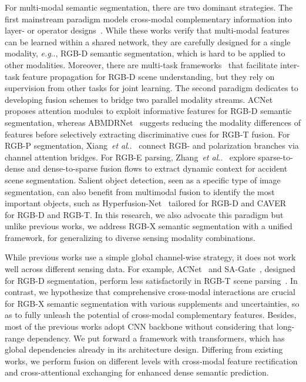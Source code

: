\documentclass[journal]{IEEEtran}
\makeatletter
\DeclareRobustCommand\onedot{\futurelet\@let@token\@onedot}
\def\@onedot{\ifx\@let@token.\else.\null\fi\xspace}
\def\eg{\emph{e.g}\onedot} \def\Eg{\emph{E.g}\onedot}
\def\etal{\emph{et al}\onedot}
\makeatother
\begin{document}
For multi-modal semantic segmentation, there are two dominant strategies. The first mainstream paradigm models cross-modal complementary information into layer- or operator designs~\cite{cao2021shapeconv,chen2021spatial_guided,wang2018depth_aware,xing2020malleable,wu2020depth_adapted}.
While these works verify that multi-modal features can be learned within a shared network, they are carefully designed for a single modality, \eg, RGB-D semantic segmentation, which is hard to be applied to other modalities.
Moreover, there are multi-task frameworks~\cite{zhang2019pattern,bachmann2022multimae} that facilitate inter-task feature propagation for RGB-D scene understanding, but they rely on supervision from other tasks for joint learning.
The second paradigm dedicates to developing fusion schemes to bridge two parallel modality streams.
ACNet~\cite{hu2019acnet} proposes attention modules to exploit informative features for RGB-D semantic segmentation, whereas ABMDRNet~\cite{zhang2021abmdrnet} suggests reducing the modality differences of features before selectively extracting discriminative cues for RGB-T fusion. 
For RGB-P segmentation, Xiang~\etal~\cite{xiang2021polarization} connect RGB- and polarization branches via channel attention bridges.
For RGB-E parsing, Zhang~\etal~\cite{zhang2021issafe} explore sparse-to-dense and dense-to-sparse fusion flows to extract dynamic context for accident scene segmentation.
Salient object detection, seen as a specific type of image segmentation, can also benefit from multimodal fusion to identify the most important objects, such as Hyperfusion-Net~\cite{zhang2019hyperfusion} tailored for RGB-D and CAVER~\cite{pang2023caver} for RGB-D and RGB-T.
In this research, we also advocate this paradigm but unlike previous works, we address RGB-X semantic segmentation with a unified framework, for generalizing to diverse sensing modality combinations.

While previous works use a simple global channel-wise strategy, it does not work well across different sensing data. For example, ACNet~\cite{hu2019acnet} and SA-Gate~\cite{chen2020sa_gate}, designed for RGB-D segmentation, perform less satisfactorily in RGB-T scene parsing~\cite{zhang2021abmdrnet}. In contrast, we hypothesize that comprehensive cross-modal interactions are crucial for RGB-X semantic segmentation with various supplements and uncertainties, so as to fully unleash the potential of cross-modal complementary features. Besides, most of the previous works adopt CNN backbone without considering that long-range dependency.
We put forward a framework with transformers, which has global dependencies already in its architecture design.
Differing from existing works, we perform fusion on different levels with cross-modal feature rectification and cross-attentional exchanging for enhanced dense semantic prediction.
\end{document}
